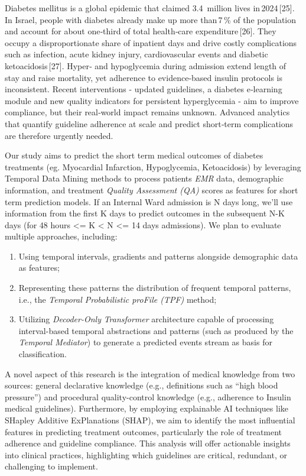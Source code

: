 \documentclass[
]{article}
\begin{document}
Diabetes mellitus is a global epidemic that claimed 3.4 \,million lives
in\,2024\,{[}25{]}. In Israel, people with diabetes already make up more
than\,7\,\% of the population and account for about one‑third of total
health‑care expenditure\,{[}26{]}. They occupy a disproportionate share
of inpatient days and drive costly complications such as infection,
acute kidney injury, cardiovascular events and diabetic
ketoacidosis\,{[}27{]}. Hyper‑ and hypoglycemia during admission extend
length of stay and raise mortality, yet adherence to evidence‑based
insulin protocols is inconsistent. Recent interventions - updated
guidelines, a diabetes e‑learning module and new quality indicators for
persistent hyperglycemia - aim to improve compliance, but their
real‑world impact remains unknown. Advanced analytics that quantify
guideline adherence at scale and predict short‑term complications are
therefore urgently needed.

Our study aims to predict the short term medical outcomes of diabetes
treatments (eg. Myocardial Infarction, Hypoglycemia, Ketoacidosis) by
leveraging Temporal Data Mining methods to process
patients\textquotesingle{} \emph{EMR} data, demographic information, and
treatment \emph{Quality Assessment (QA)} scores as features for short
term prediction models. If an Internal Ward admission is N days long,
we'll use information from the first K days to predict outcomes in the
subsequent N-K days (for 48 hours \textless= K \textless{} N \textless=
14 days admissions). We plan to evaluate multiple approaches, including:

\begin{enumerate}
\def\labelenumi{\arabic{enumi}.}
\item
  Using temporal intervals, gradients and patterns alongside demographic
  data as features;
\item
  Representing these patterns the distribution of frequent temporal
  patterns, i.e., the \emph{Temporal Probabilistic proFile (TPF)}
  method;
\item
  Utilizing \emph{Decoder-Only} \emph{Transformer} architecture capable
  of processing interval-based temporal abstractions and patterns (such
  as produced by the \emph{Temporal Mediator}) to generate a predicted
  events stream as basis for classification.
\end{enumerate}

A novel aspect of this research is the integration of medical knowledge
from two sources: general declarative knowledge (e.g., definitions such
as ``high blood pressure'') and procedural quality-control knowledge
(e.g., adherence to Insulin medical guidelines). Furthermore, by
employing explainable AI techniques like SHapley Additive ExPlanations
(SHAP), we aim to identify the most influential features in predicting
treatment outcomes, particularly the role of treatment adherence and
guideline compliance. This analysis will offer actionable insights into
clinical practices, highlighting which guidelines are critical,
redundant, or challenging to implement.
\end{document}
